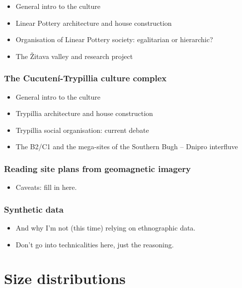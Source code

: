 \documentclass[
  12pt,
]{book}
\providecommand{\tightlist}{%
  \setlength{\itemsep}{0pt}\setlength{\parskip}{0pt}}
\begin{document}
\begin{itemize}
\item
  General intro to the culture
\item
  Linear Pottery architecture and house construction
\item
  Organisation of Linear Pottery society: egalitarian or hierarchic?
\item
  The Žitava valley and research project
\end{itemize}

\hypertarget{trypillia}{%
\section{The Cucutení-Trypillia culture complex}\label{trypillia}}

\begin{itemize}
\item
  General intro to the culture
\item
  Trypillia architecture and house construction
\item
  Trypillia social organisation: current debate
\item
  The B2/C1 and the mega-sites of the Southern Bugh -- Dnipro interfluve
\end{itemize}

\hypertarget{reading-site-plans-from-geomagnetic-imagery}{%
\section{Reading site plans from geomagnetic imagery}\label{reading-site-plans-from-geomagnetic-imagery}}

\begin{itemize}
\tightlist
\item
  Caveats: fill in here.
\end{itemize}

\hypertarget{synthetic-data}{%
\section{Synthetic data}\label{synthetic-data}}

\begin{itemize}
\item
  And why I'm not (this time) relying on ethnographic data.
\item
  Don't go into technicalities here, just the reasoning.
\end{itemize}

\hypertarget{part-size-distributions}{%
\part{Size distributions}\label{part-size-distributions}}
\end{document}
